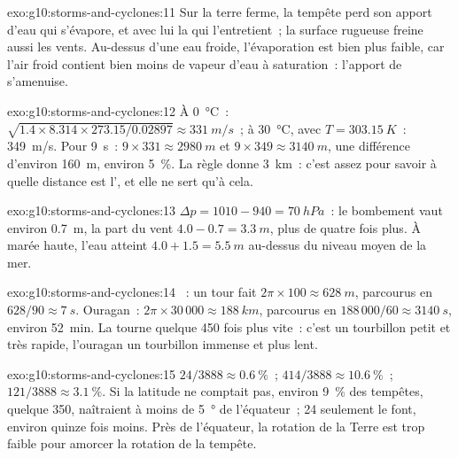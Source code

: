 \begin{solution}{exo:g10:storms-and-cyclones:11}
Sur la terre ferme, la tempête perd son apport d'eau qui s'évapore, et avec
lui la  qui l'entretient~; la surface rugueuse freine aussi
les vents. Au-dessus d'une eau froide, l'évaporation est bien plus faible,
car l'air froid contient bien moins de vapeur d'eau à saturation~: l'apport
de  s'amenuise.
\end{solution}

\begin{solution}{exo:g10:storms-and-cyclones:12}
À \qty{0}{\degreeCelsius}~: $\sqrt{1.4 \times 8.314 \times 273.15/0.02897}
\approx \qty{331}{m/s}$~; à \qty{30}{\degreeCelsius}, avec $T =
\qty{303.15}{K}$~: \qty{349}{m/s}. Pour \qty{9}{s}~: $9 \times 331 \approx
\qty{2980}{m}$ et $9 \times 349 \approx \qty{3140}{m}$, une différence
d'environ \qty{160}{m}, environ \qty{5}{\percent}. La règle donne
\qty{3}{km}~: c'est assez pour savoir à quelle distance est l', et elle
ne sert qu'à cela.
\end{solution}

\begin{solution}{exo:g10:storms-and-cyclones:13}
$\Delta p = 1010 - 940 = \qty{70}{hPa}$~: le bombement vaut environ \qty{0.7}{m}, la
part du vent $4.0 - 0.7 = \qty{3.3}{m}$, plus de quatre fois plus. À marée
haute, l'eau atteint $4.0 + 1.5 = \qty{5.5}{m}$ au-dessus du niveau moyen
de la mer.
\end{solution}

\begin{solution}{exo:g10:storms-and-cyclones:14}
~: un tour fait $2\pi \times 100 \approx \qty{628}{m}$, parcourus en
$628/90 \approx \qty{7}{s}$. Ouragan~: $2\pi \times 30\,000 \approx
\qty{188}{km}$, parcourus en $188\,000/60 \approx \qty{3140}{s}$, environ
\qty{52}{min}. La  tourne quelque 450 fois plus vite~: c'est un
tourbillon petit et très rapide, l'ouragan un tourbillon immense et plus
lent.
\end{solution}

\begin{solution}{exo:g10:storms-and-cyclones:15}
$24/3888 \approx \qty{0.6}{\percent}$~; $414/3888 \approx
\qty{10.6}{\percent}$~; $121/3888 \approx \qty{3.1}{\percent}$. Si la
latitude ne comptait pas, environ \qty{9}{\percent} des tempêtes, quelque
350, naîtraient à moins de \qty{5}{\degree} de l'équateur~; 24 seulement le
font, environ quinze fois moins. Près de l'équateur, la rotation de la Terre
est trop faible pour amorcer la rotation de la tempête.
\end{solution}

